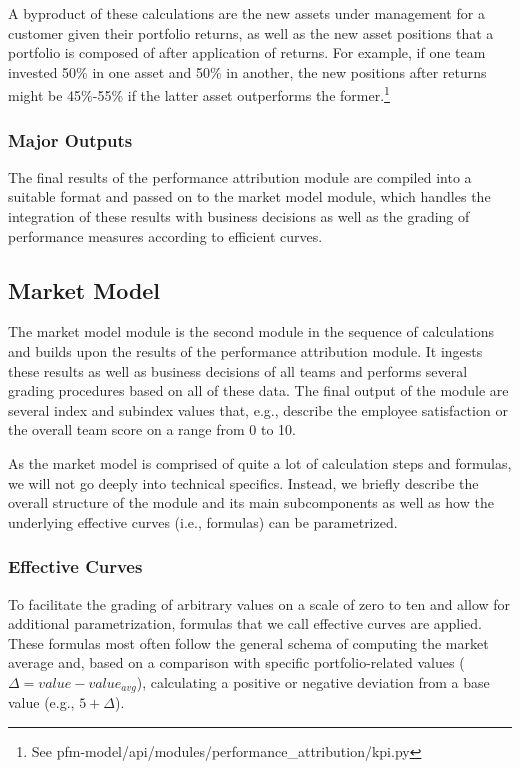 A byproduct of these calculations are the new assets under management for a customer given their portfolio returns, as well as the new asset positions that a portfolio is composed of after application of returns. For example, if one team invested 50\% in one asset and 50\% in another, the new positions after returns might be 45\%-55\% if the latter asset outperforms the former.\footnote{See pfm-model/api/modules/performance\_attribution/kpi.py}

\subsubsection{Major Outputs}
The final results of the performance attribution module are compiled into a suitable format and passed on to the market model module, which handles the integration of these results with business decisions as well as the grading of performance measures according to efficient curves.


\subsection{Market Model}
The market model module is the second module in the sequence of calculations and builds upon the results of the performance attribution module. It ingests these results as well as business decisions of all teams and performs several grading procedures based on all of these data. The final output of the module are several index and subindex values that, e.g., describe the employee satisfaction or the overall team score on a range from 0 to 10.

As the market model is comprised of quite a lot of calculation steps and formulas, we will not go deeply into technical specifics. Instead, we briefly describe the overall structure of the module and its main subcomponents as well as how the underlying effective curves (i.e., formulas) can be parametrized.

\subsubsection{Effective Curves}
To facilitate the grading of arbitrary values on a scale of zero to ten and allow for additional parametrization, formulas that we call effective curves are applied. These formulas most often follow the general schema of computing the market average and, based on a comparison with specific portfolio-related values (\(\Delta = value - value_{avg}\)), calculating a positive or negative deviation from a base value (e.g., \(5 + \Delta \)).

